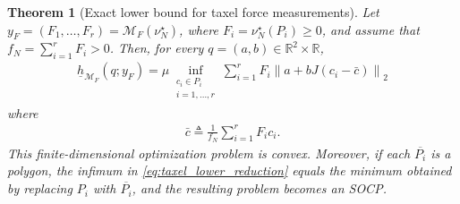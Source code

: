 \documentclass[11pt,a4paper]{article}
\theoremstyle{proposition}
\newtheorem{theorem}{Theorem}[section]
\begin{document}
\begin{theorem}[Exact lower bound for taxel force measurements]
\label{thm:taxel_lower}
    Let $y_F=(F_1,\ldots,F_r)=\mathcal M_F(\nu_N^\star)$, where $F_i=\nu_N^\star(P_i)\geq 0$, and assume that
    $f_N=\sum_{i=1}^r F_i>0$. Then, for every $q=(a,b)\in\mathbb R^2\times\mathbb R$,
    \begin{align}
        \label{eq:taxel_lower_reduction}
        \boxed{\underline h_{\mathcal M_F}(q;y_F)
        =
        \mu
        \inf_{\substack{c_i\in P_i\\i=1,\ldots,r}}
        \sum_{i=1}^r
        F_i\left\|a+bJ(c_i-\bar c)\right\|_2}
    \end{align}
where     \begin{align}
        \bar c
        \triangleq
        \frac{1}{f_N}\sum_{i=1}^r F_i c_i.
    \end{align}
    This finite-dimensional optimization problem is convex. 
    Moreover, if each $\overline{P_i}$ is a polygon, the infimum in \eqref{eq:taxel_lower_reduction} equals the
    minimum obtained by replacing $P_i$ with $\overline{P_i}$, and the resulting problem becomes an SOCP.
\end{theorem}
\end{document}
